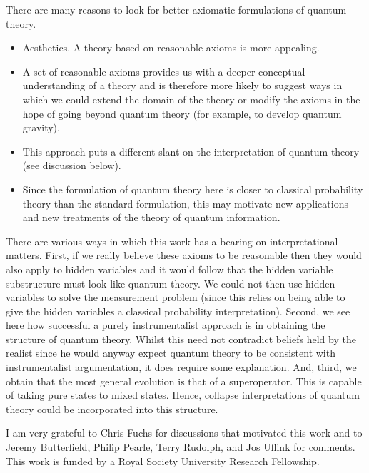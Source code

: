 \documentclass[12pt]{article}
\begin{document}
There are many reasons to look for better axiomatic formulations of
quantum theory.
\begin{itemize}
\item Aesthetics.  A theory based on reasonable axioms is more
appealing.
\item A set of reasonable axioms provides us with a deeper conceptual
understanding of a theory and is therefore more likely to suggest ways
in which we could extend the domain of the theory or modify the axioms
in the hope of going beyond quantum theory (for example, to develop
quantum gravity).
\item This approach puts a different slant on the interpretation
of quantum theory (see discussion below).
\item  Since the formulation of quantum theory here is closer to
classical probability theory than the standard formulation, this may
motivate new applications and new treatments of the theory of quantum
information.
\end{itemize}

There are various ways in which this work has a bearing on
interpretational matters.  First, if we really believe these axioms to
be reasonable then they would also apply to hidden variables and it
would follow that the hidden variable substructure must look
like quantum theory.  We could not then use hidden variables to solve
the measurement problem (since this relies on being able to give the
hidden variables a classical probability interpretation).
Second, we see here how successful a purely instrumentalist approach is
in obtaining the structure of quantum theory. Whilst this need not contradict
beliefs held by the realist since he would anyway expect quantum theory
to be consistent with instrumentalist argumentation, it does require
some explanation.  And, third, we obtain that the most general evolution
is that of a
superoperator.  This is capable of taking pure states to mixed states.
Hence, collapse interpretations of quantum theory could be incorporated
into this structure.

\vspace{6mm}


\vspace{6mm}

I am very grateful to Chris Fuchs for discussions that motivated this
work and to Jeremy Butterfield, Philip Pearle, Terry Rudolph, and Jos
Uffink for comments. This work is funded by a Royal Society University
Research Fellowship.
\end{document}
